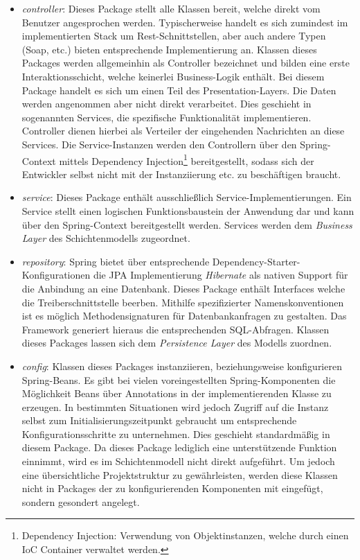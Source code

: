 \begin{itemize}
  \item \emph{controller}: Dieses Package stellt alle Klassen bereit, welche direkt vom Benutzer angesprochen werden. Typischerweise handelt es sich zumindest im implementierten Stack um Rest-Schnittstellen, aber auch andere Typen (Soap, etc.) bieten entsprechende Implementierung an. Klassen dieses Packages werden allgemeinhin als Controller bezeichnet und bilden eine erste Interaktionsschicht, welche keinerlei Business-Logik enthält. Bei diesem Package handelt es sich um einen Teil des Presentation-Layers. Die Daten werden angenommen aber nicht direkt verarbeitet. Dies geschieht in sogenannten Services, die spezifische Funktionalität implementieren. Controller dienen hierbei als Verteiler der eingehenden Nachrichten an diese Services. Die Service-Instanzen werden den Controllern über den Spring-Context mittels Dependency Injection\footnote{Dependency Injection: Verwendung von Objektinstanzen, welche durch einen IoC Container verwaltet werden.} bereitgestellt, sodass sich der Entwickler selbst nicht mit der Instanziierung etc. zu beschäftigen braucht. 

  \item \emph{service}: Dieses Package enthält ausschließlich Service-Implementierungen. Ein Service stellt einen logischen Funktionsbaustein der Anwendung dar und kann über den Spring-Context bereitgestellt werden. Services werden dem \emph{Business Layer} des Schichtenmodells zugeordnet.

  \item \emph{repository}: Spring bietet über entsprechende Dependency-Starter-Konfigurationen die JPA Implementierung \emph{Hibernate} als nativen Support für die Anbindung an eine Datenbank. Dieses Package enthält Interfaces welche die Treiberschnittstelle beerben. Mithilfe spezifizierter Namenskonventionen ist es möglich Methodensignaturen für Datenbankanfragen zu gestalten. Das Framework generiert hieraus die entsprechenden SQL-Abfragen. Klassen dieses Packages lassen sich dem \emph{Persistence Layer} des Modells zuordnen.

  \item \emph{config}: Klassen dieses Packages instanziieren, beziehungsweise konfigurieren Spring-Beans. Es gibt bei vielen voreingestellten Spring-Komponenten die Möglichkeit Beans über Annotations in der implementierenden Klasse zu erzeugen. In bestimmten Situationen wird jedoch Zugriff auf die Instanz selbst zum Initialisierungszeitpunkt gebraucht um entsprechende Konfigurationsschritte zu unternehmen. Dies geschieht standardmäßig in diesem Package. Da dieses Package lediglich eine unterstützende Funktion einnimmt, wird es im Schichtenmodell nicht direkt aufgeführt. Um jedoch eine übersichtliche Projektstruktur zu gewährleisten, werden diese Klassen nicht in Packages der zu konfigurierenden Komponenten mit eingefügt, sondern gesondert angelegt.


\end{itemize}
